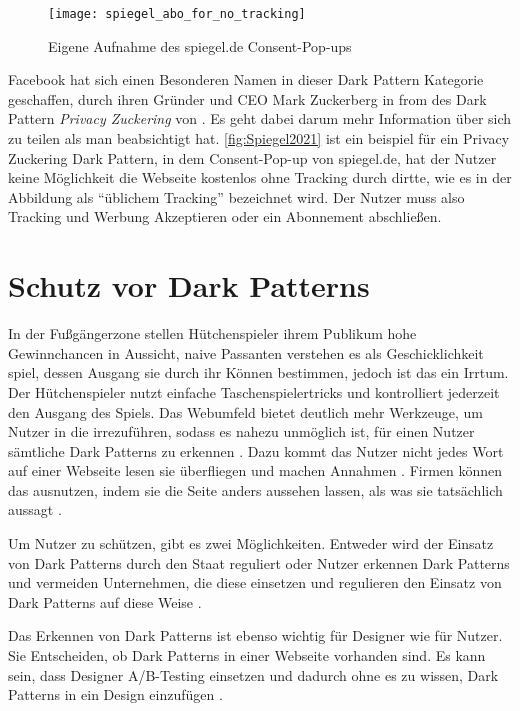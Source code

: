 \documentclass[conference,compsoc,final,a4paper]{IEEEtran}
\begin{document}
\begin{figure}[!ht]
  \centering
  \texttt{[image: spiegel\_abo\_for\_no\_tracking]}
  \caption{Eigene Aufnahme des spiegel.de Consent-Pop-ups~\autocite{Spiegel2021}}
  \label{fig:Spiegel2021}
\end{figure}

Facebook hat sich einen Besonderen Namen in dieser Dark Pattern Kategorie geschaffen, durch ihren Gründer und CEO Mark Zuckerberg in from des Dark Pattern \textit{Privacy Zuckering} von \citeauthor{Brignull} \autocite{Brignull}. Es geht dabei darum mehr Information über sich zu teilen als man beabsichtigt hat. \autoref{fig:Spiegel2021} ist ein beispiel für ein Privacy Zuckering Dark Pattern, in dem Consent-Pop-up von spiegel.de, hat der Nutzer keine Möglichkeit die Webseite kostenlos ohne Tracking durch dirtte, wie es in der Abbildung als \enquote{üblichem Tracking} bezeichnet wird. Der Nutzer muss also Tracking und Werbung Akzeptieren oder ein Abonnement abschließen. 


\section{Schutz vor Dark Patterns}
In der Fußgängerzone stellen Hütchenspieler ihrem Publikum hohe Gewinnchancen in Aussicht, naive Passanten verstehen es als Geschicklichkeit spiel, dessen Ausgang sie durch ihr Können bestimmen, jedoch ist das ein Irrtum. Der Hütchenspieler nutzt einfache Taschenspielertricks und kontrolliert jederzeit den Ausgang des Spiels. Das Webumfeld bietet deutlich mehr Werkzeuge, um Nutzer in die irrezuführen, sodass es nahezu unmöglich ist, für einen Nutzer sämtliche Dark Patterns zu erkennen \autocite{M.Bhoot2020}. Dazu kommt das Nutzer nicht jedes Wort auf einer Webseite lesen sie überfliegen und machen Annahmen \autocite{Brignull}. Firmen können das ausnutzen, indem sie die Seite anders aussehen lassen, als was sie tatsächlich aussagt \autocite{Brignull}.

Um Nutzer zu schützen, gibt es zwei Möglichkeiten. Entweder wird der Einsatz von Dark Patterns durch den Staat reguliert oder Nutzer erkennen Dark Patterns und vermeiden Unternehmen, die diese einsetzen und regulieren den Einsatz von Dark Patterns auf diese Weise \autocite{Narayanan2020}.

Das Erkennen von Dark Patterns ist ebenso wichtig für Designer wie für Nutzer. Sie Entscheiden, ob Dark Patterns in einer Webseite vorhanden sind. Es kann sein, dass Designer A/B-Testing einsetzen und dadurch ohne es zu wissen, Dark Patterns in ein Design einzufügen \autocite{Narayanan2020}.
\end{document}
